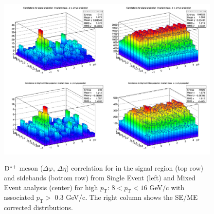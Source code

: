 \begin{figure}
\centering
{\includegraphics[width=1\linewidth]{figures/DStar_pp/InputCorr_Dstar_Canvas_pool1_pTbin7_thr0dot3to99dot0.png}}
 \caption{${\rm D^{*+}}$ meson ($\Delta\varphi$, $ \Delta\eta$) correlation for in the signal region (top row) and sidebands (bottom row) from  Single Event (left) and Mixed Event analysis (center) for high $p_\mathrm{T}$: $8 < p_\mathrm{T}<16$ GeV/c with associated $p_\mathrm{T} >$ 0.3 GeV/c. The right column shows the SE/ME corrected distributions.}
\label{fig:DStarME}
\end{figure}


